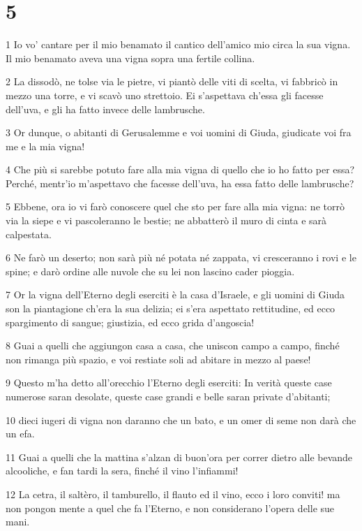 \chapter{5}

\par 1 Io vo' cantare per il mio benamato il cantico dell'amico mio circa la sua vigna. Il mio benamato aveva una vigna sopra una fertile collina.
\par 2 La dissodò, ne tolse via le pietre, vi piantò delle viti di scelta, vi fabbricò in mezzo una torre, e vi scavò uno strettoio. Ei s'aspettava ch'essa gli facesse dell'uva, e gli ha fatto invece delle lambrusche.
\par 3 Or dunque, o abitanti di Gerusalemme e voi uomini di Giuda, giudicate voi fra me e la mia vigna!
\par 4 Che più si sarebbe potuto fare alla mia vigna di quello che io ho fatto per essa? Perché, mentr'io m'aspettavo che facesse dell'uva, ha essa fatto delle lambrusche?
\par 5 Ebbene, ora io vi farò conoscere quel che sto per fare alla mia vigna: ne torrò via la siepe e vi pascoleranno le bestie; ne abbatterò il muro di cinta e sarà calpestata.
\par 6 Ne farò un deserto; non sarà più né potata né zappata, vi cresceranno i rovi e le spine; e darò ordine alle nuvole che su lei non lascino cader pioggia.
\par 7 Or la vigna dell'Eterno degli eserciti è la casa d'Israele, e gli uomini di Giuda son la piantagione ch'era la sua delizia; ei s'era aspettato rettitudine, ed ecco spargimento di sangue; giustizia, ed ecco grida d'angoscia!
\par 8 Guai a quelli che aggiungon casa a casa, che uniscon campo a campo, finché non rimanga più spazio, e voi restiate soli ad abitare in mezzo al paese!
\par 9 Questo m'ha detto all'orecchio l'Eterno degli eserciti: In verità queste case numerose saran desolate, queste case grandi e belle saran private d'abitanti;
\par 10 dieci iugeri di vigna non daranno che un bato, e un omer di seme non darà che un efa.
\par 11 Guai a quelli che la mattina s'alzan di buon'ora per correr dietro alle bevande alcooliche, e fan tardi la sera, finché il vino l'infiammi!
\par 12 La cetra, il saltèro, il tamburello, il flauto ed il vino, ecco i loro conviti! ma non pongon mente a quel che fa l'Eterno, e non considerano l'opera delle sue mani.
